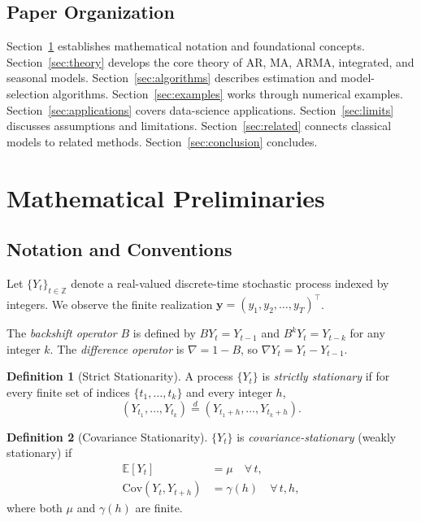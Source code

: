 \documentclass[conference]{IEEEtran}
\theoremstyle{definition}
\newtheorem{definition}{Definition}[section]
\begin{document}
\subsection*{Paper Organization}
Section~\ref{sec:prelim} establishes mathematical notation and foundational
concepts. Section~\ref{sec:theory} develops the core theory of AR, MA, ARMA,
integrated, and seasonal models. Section~\ref{sec:algorithms} describes
estimation and model-selection algorithms. Section~\ref{sec:examples} works
through numerical examples. Section~\ref{sec:applications} covers data-science
applications. Section~\ref{sec:limits} discusses assumptions and limitations.
Section~\ref{sec:related} connects classical models to related methods.
Section~\ref{sec:conclusion} concludes.

\section{Mathematical Preliminaries}
\label{sec:prelim}

\subsection{Notation and Conventions}

Let $\{Y_t\}_{t \in \mathbb{Z}}$ denote a real-valued discrete-time stochastic
process indexed by integers. We observe the finite realization
$\mathbf{y} = (y_1, y_2, \ldots, y_T)^{\top}$.

The \emph{backshift operator} $B$ is defined by $BY_t = Y_{t-1}$ and
$B^k Y_t = Y_{t-k}$ for any integer $k$. The \emph{difference operator} is
$\nabla = 1 - B$, so $\nabla Y_t = Y_t - Y_{t-1}$.

\begin{definition}[Strict Stationarity]
A process $\{Y_t\}$ is \emph{strictly stationary} if for every finite set of
indices $\{t_1,\ldots,t_k\}$ and every integer $h$,
\[
  (Y_{t_1},\ldots,Y_{t_k}) \stackrel{d}{=} (Y_{t_1+h},\ldots,Y_{t_k+h}).
\]
\end{definition}

\begin{definition}[Covariance Stationarity]
$\{Y_t\}$ is \emph{covariance-stationary} (weakly stationary) if
\begin{align}
  \mathbb{E}[Y_t] &= \mu \quad \forall\, t, \label{eq:mean_stat} \\
  \mathrm{Cov}(Y_t, Y_{t+h}) &= \gamma(h) \quad \forall\, t, h, \label{eq:cov_stat}
\end{align}
where both $\mu$ and $\gamma(h)$ are finite.
\end{definition}
\end{document}
